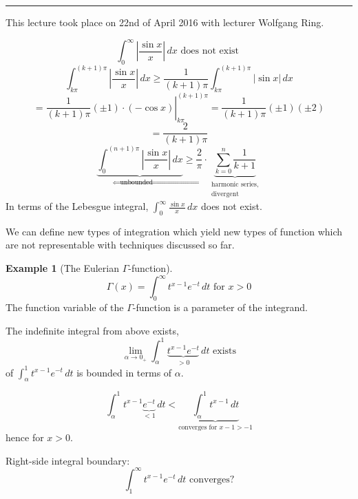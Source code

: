 \documentclass[a4paper,landscape,twocolumn]{article}
\theoremstyle{definition}
\newtheorem{ex}{Example}
\newcommand\abs[1]{\left|#1\right|}
\newcommand\meta[3]{\hrule{} This #1 took place on #2 with lecturer #3.\par}
\begin{document}
\meta{lecture}{22nd of April 2016}{Wolfgang Ring}

\[ \int_0^\infty \abs{\frac{\sin{x}}{x}} \, dx \text{ does not exist } \]
\[
  \int_{k\pi}^{(k+1)\pi} \abs{\frac{\sin{x}}{x}} \, dx
  \geq \frac{1}{(k+1) \pi} \int_{k\pi}^{(k+1)\pi} \abs{\sin{x}} \, dx
\] \[
  = \left.\frac{1}{(k+1) \pi} (\pm 1) \cdot \left(-\cos{x}\right) \right|_{k\pi}^{(k+1) \pi}
  = \frac{1}{(k+1) \pi} (\pm 1) (\pm 2)
\] \[
  = \frac{2}{(k+1)\pi}
\] \[
  \underbrace{\int_0^{(n+1)\pi} \abs{\frac{\sin{x}}{x}} \, dx}_{\text{unbounded} \Leftarrow}
    \geq \frac{2}{\pi} \cdot \underbrace{\sum_{k=0}^n \frac{1}{k+1}}_{\substack{\text{harmonic series,} \\ \text{divergent}}}
\]
In terms of the Lebesgue integral, $\int_0^\infty \frac{\sin{x}}{x} \, dx$ does not exist.

We can define new types of integration which yield new types of function which are not representable with techniques discussed so far.

\begin{ex}[The Eulerian $\Gamma$-function]
  \[ \Gamma(x) = \int_0^\infty t^{x-1} e^{-t} \, dt \text{ for } x > 0 \]
  The function variable of the $\Gamma$-function is a parameter of the integrand.
\end{ex}

The indefinite integral from above exists,
\[ \lim_{\alpha\to 0_+} \int_\alpha^1 \underbrace{t^{x-1} e^{-t}}_{>0} \, dt \text{ exists} \]
of $\int_\alpha^1 t^{x-1} e^{-t} \, dt$ is bounded in terms of $\alpha$.

\[ \int_\alpha^1 t^{x-1} \underbrace{e^{-t}}_{<1} \, dt < \underbrace{\int_\alpha^1 t^{x-1} \, dt}_{\text{converges for } x - 1 > -1} \]
hence for $x > 0$.

Right-side integral boundary:
\[ \int_1^\infty t^{x-1} e^{-t} \, dt \text{ converges?} \]
\end{document}
